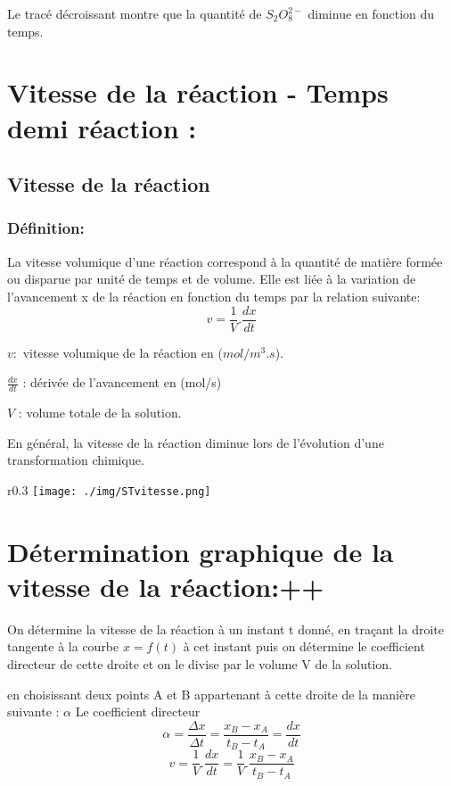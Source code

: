 \documentclass[12pt]{article}
\begin{document}
\begin{itemize}
	      Le tracé décroissant montre que la quantité de $S_2O_8^{2-}$ diminue en fonction du temps.

\end{itemize}


\section{Vitesse de la réaction - Temps demi réaction :  }

\subsection{Vitesse de la réaction}
\subsubsection{Définition:}
La vitesse volumique d’une réaction correspond à la quantité de matière formée ou disparue par unité de temps et de volume.
Elle est liée à la variation de l’avancement x de la réaction en fonction du temps par la relation suivante:
$$v = \frac{1}{V}.\frac{dx}{dt}$$

$v : $ vitesse volumique de la réaction en ($mol/m^3.s$).

$\frac{dx}{dt}$ : dérivée de l'avancement en (mol/s)

$V$ : volume totale de la solution.

En général, la vitesse de la réaction diminue lors de l'évolution d'une transformation chimique.

\begin{wrapfigure}[2]{r}{0.3\textwidth}
	\vspace{-1.5cm}
	\texttt{[image: ./img/STvitesse.png]}
\end{wrapfigure}


\section*{Détermination graphique de la vitesse de la réaction:++}
On détermine la vitesse de la réaction à un instant t donné, en traçant la droite tangente à la courbe $x=f(t)$ à cet instant puis on détermine le coefficient directeur de cette droite et on le divise par le volume V de la solution.

en choisissant deux points A et B appartenant à cette droite de la manière suivante : $\alpha$
Le coefficient directeur
$$\alpha = \frac{\Delta{x}}{\Delta{t}} = \frac{x_B - x_A}{t_B - t_A} = \frac{dx}{dt}$$
$$v = \frac{1}{V}.\frac{dx}{dt} = \frac{1}{V}.\frac{x_B - x_A}{t_B - t_A}$$
\end{document}
